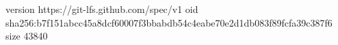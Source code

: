 version https://git-lfs.github.com/spec/v1
oid sha256:b7f151abcc45a8dcf60007f3bbabdb54c4eabe70e2d1db083f89fcfa39c387f6
size 43840
